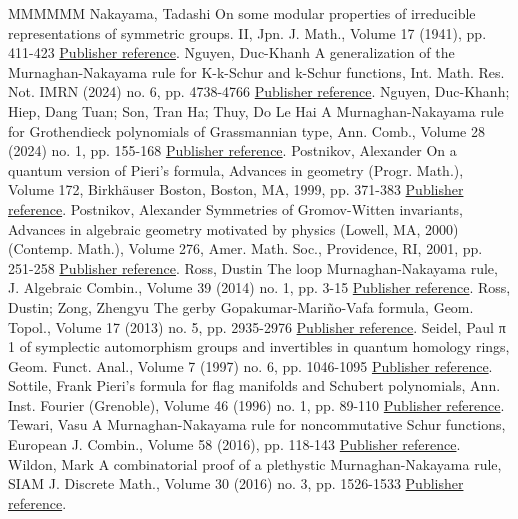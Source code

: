 \documentclass[11pt]{article}
\theoremstyle{definition}
\numberwithin{equation}{section}
\begin{document}
\begin{thebibliography}{MMMMMM}
 Nakayama, Tadashi On some modular properties of irreducible representations of symmetric groups. II, Jpn. J. Math., Volume 17 (1941), pp. 411-423 \href{https://alco.centre-mersenne.org/articles/10.5802/alco.427/#Na41b}{Publisher reference}.
 Nguyen, Duc-Khanh A generalization of the Murnaghan-Nakayama rule for K-k-Schur and k-Schur functions, Int. Math. Res. Not. IMRN (2024) no. 6, pp. 4738-4766 \href{https://alco.centre-mersenne.org/articles/10.5802/alco.427/#Khanh}{Publisher reference}.
 Nguyen, Duc-Khanh; Hiep, Dang Tuan; Son, Tran Ha; Thuy, Do Le Hai A Murnaghan-Nakayama rule for Grothendieck polynomials of Grassmannian type, Ann. Comb., Volume 28 (2024) no. 1, pp. 155-168 \href{https://alco.centre-mersenne.org/articles/10.5802/alco.427/#KHST}{Publisher reference}.
 Postnikov, Alexander On a quantum version of Pieri’s formula, Advances in geometry (Progr. Math.), Volume 172, Birkhäuser Boston, Boston, MA, 1999, pp. 371-383 \href{https://alco.centre-mersenne.org/articles/10.5802/alco.427/#Postnikov}{Publisher reference}.
 Postnikov, Alexander Symmetries of Gromov-Witten invariants, Advances in algebraic geometry motivated by physics (Lowell, MA, 2000) (Contemp. Math.), Volume 276, Amer. Math. Soc., Providence, RI, 2001, pp. 251-258 \href{https://alco.centre-mersenne.org/articles/10.5802/alco.427/#Postnikov_symmetry}{Publisher reference}.
 Ross, Dustin The loop Murnaghan-Nakayama rule, J. Algebraic Combin., Volume 39 (2014) no. 1, pp. 3-15 \href{https://alco.centre-mersenne.org/articles/10.5802/alco.427/#Ro14}{Publisher reference}.
 Ross, Dustin; Zong, Zhengyu The gerby Gopakumar-Mariño-Vafa formula, Geom. Topol., Volume 17 (2013) no. 5, pp. 2935-2976 \href{https://alco.centre-mersenne.org/articles/10.5802/alco.427/#RoZo13}{Publisher reference}.
 Seidel, Paul π 1  of symplectic automorphism groups and invertibles in quantum homology rings, Geom. Funct. Anal., Volume 7 (1997) no. 6, pp. 1046-1095 \href{https://alco.centre-mersenne.org/articles/10.5802/alco.427/#Seidel}{Publisher reference}.
 Sottile, Frank Pieri’s formula for flag manifolds and Schubert polynomials, Ann. Inst. Fourier (Grenoble), Volume 46 (1996) no. 1, pp. 89-110 \href{https://alco.centre-mersenne.org/articles/10.5802/alco.427/#So96}{Publisher reference}.
 Tewari, Vasu A Murnaghan-Nakayama rule for noncommutative Schur functions, European J. Combin., Volume 58 (2016), pp. 118-143 \href{https://alco.centre-mersenne.org/articles/10.5802/alco.427/#Tewari}{Publisher reference}.
 Wildon, Mark A combinatorial proof of a plethystic Murnaghan-Nakayama rule, SIAM J. Discrete Math., Volume 30 (2016) no. 3, pp. 1526-1533 \href{https://alco.centre-mersenne.org/articles/10.5802/alco.427/#Wildon}{Publisher reference}.
\end{thebibliography}
\end{document}
